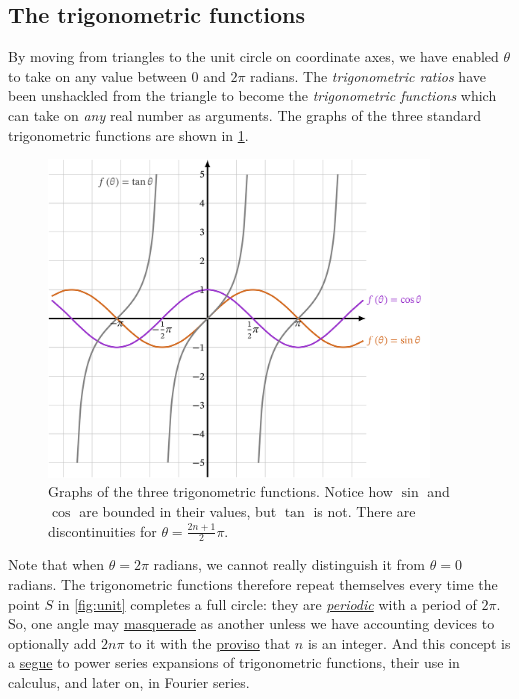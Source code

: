 \documentclass[
  a4paper,
]{article}
\begin{document}
\hypertarget{the-trigonometric-functions}{%
\subsection{The trigonometric
functions}\label{the-trigonometric-functions}}

By moving from triangles to the unit circle on coordinate axes, we have
enabled \(\theta\) to take on any value between 0 and \(2\pi\) radians.
The \emph{trigonometric ratios} have been unshackled from the triangle
to become the \emph{trigonometric functions} which can take on
\emph{any} real number as arguments. The graphs of the three standard
trigonometric functions are shown in \cref{fig:threegraph}.

\begin{figure}
\hypertarget{fig:threegraph}{%
\centering
\includegraphics[width=0.9\textwidth,height=\textheight]{images/threegraph.png}
\caption{Graphs of the three trigonometric functions. Notice how
\(\sin\) and \(\cos\) are bounded in their values, but \(\tan\) is not.
There are discontinuities for
\(\theta=\frac{2n+1}{2}\pi\).}\label{fig:threegraph}
}
\end{figure}

Note that when \(\theta = 2\pi\) radians, we cannot really distinguish
it from \(\theta=0\) radians. The trigonometric functions therefore
repeat themselves every time the point \(S\) in \cref{fig:unit}
completes a full circle: they are
\href{https://mathworld.wolfram.com/PeriodicFunction.html}{\emph{periodic}}
with a period of \(2\pi\). So, one angle may
\href{https://www.thefreedictionary.com/masquerade}{masquerade} as
another unless we have accounting devices to optionally add \(2n\pi\) to
it with the
\href{https://dictionary.cambridge.org/dictionary/english/proviso}{proviso}
that \(n\) is an integer. And this concept is a
\href{https://www.dictionary.com/browse/segue}{segue} to power series
expansions of trigonometric functions, their use in calculus, and later
on, in Fourier series.
\end{document}
